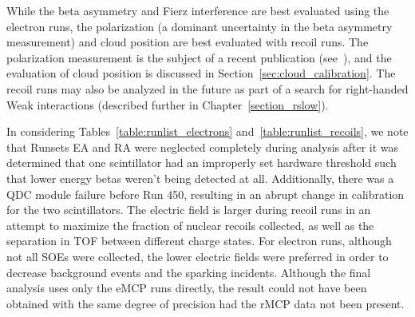 


While the beta asymmetry and Fierz interference are best evaluated using the electron runs, the polarization (a dominant uncertainty in the beta asymmetry measurement) and cloud position are best evaluated with recoil runs.  The polarization measurement is the subject of a recent publication (see~\cite{ben_OP}), and the evaluation of cloud position is discussed in Section~\ref{sec:cloud_calibration}.  
The recoil runs may also be analyzed in the future as part of a search for right-handed Weak interactions (described further in Chapter~\ref{section_rslow}).

In considering Tables~\ref{table:runlist_electrons} and~\ref{table:runlist_recoils}, we note that Runsets EA and RA were neglected completely during analysis after it was determined that one scintillator had an improperly set hardware threshold such that lower energy betas weren't being detected at all.  Additionally, there was a QDC module failure before Run 450, resulting in an abrupt change in calibration for the two scintillators.  The electric field is larger during recoil runs in an attempt to maximize the fraction of nuclear recoils collected, as well as the separation in TOF between different charge states.  For electron runs, although not all SOEs were collected, the lower electric fields were preferred in order to decrease background events and the sparking incidents.   Although the final analysis uses only the eMCP runs directly, the result could not have been obtained with the same degree of precision had the rMCP data not been present.  



 
